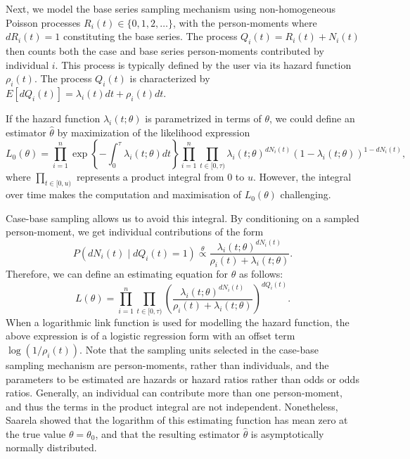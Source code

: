 \documentclass[
]{jss}
\begin{document}
Next, we model the base series sampling mechanism using non-homogeneous
Poisson processes \(R_i(t) \in \{0, 1, 2, \ldots\}\), with the
person-moments where \(dR_i(t) = 1\) constituting the base series. The
process \(Q_{i}(t) = R_i(t) + N_{i}(t)\) then counts both the case and
base series person-moments contributed by individual \(i\). This process
is typically defined by the user via its hazard function \(\rho_i(t)\).
The process \(Q_{i}(t)\) is characterized by
\(E[dQ_{i}(t)] = \lambda_{i}(t)dt + \rho_i(t)dt\).

If the hazard function \(\lambda_{i}(t; \theta)\) is parametrized in
terms of \(\theta\), we could define an estimator \(\hat{\theta}\) by
maximization of the likelihood expression
\[L_0(\theta) = \prod_{i=1}^n \exp\left\{ -\int_0^\tau \lambda_i(t; \theta) dt \right\} \prod_{i=1}^{n} \prod_{t\in[0,\tau)} \lambda_{i}(t;\theta)^{dN_{i}(t)}\left(1 - \lambda_{i}(t;\theta)\right)^{1 - dN_{i}(t)},\]
where \(\prod_{t\in[0,u)}\) represents a product integral from \(0\) to
\(u\). However, the integral over time makes the computation and
maximisation of \(L_0(\theta)\) challenging.

Case-base sampling allows us to avoid this integral. By conditioning on
a sampled person-moment, we get individual contributions of the form
\[P(dN_{i}(t) \mid dQ_{i}(t) = 1) \stackrel{\theta}{\propto} \frac{\lambda_{i}(t; \theta)^{dN_{i}(t)}}{\rho_i(t) + \lambda_{i}(t;\theta)}.\]
Therefore, we can define an estimating equation for \(\theta\) as
follows:
\[L(\theta) = \prod_{i=1}^{n} \prod_{t\in[0,\tau)} \left(\frac{\lambda_{i}(t; \theta)^{dN_{i}(t)}}{\rho_i(t) + \lambda_{i}(t;\theta)}\right)^{dQ_i(t)}.\]
When a logarithmic link function is used for modelling the hazard
function, the above expression is of a logistic regression form with an
offset term \(\log(1/\rho_i(t))\). Note that the sampling units selected
in the case-base sampling mechanism are person-moments, rather than
individuals, and the parameters to be estimated are hazards or hazard
ratios rather than odds or odds ratios. Generally, an individual can
contribute more than one person-moment, and thus the terms in the
product integral are not independent. Nonetheless, Saarela
\citeyearpar{saarela2016case} showed that the logarithm of this
estimating function has mean zero at the true value \(\theta=\theta_0\),
and that the resulting estimator \(\hat{\theta}\) is asymptotically
normally distributed.
\end{document}
